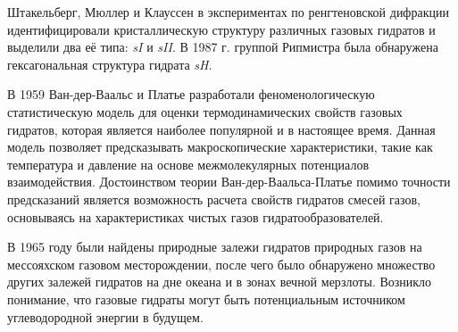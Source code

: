 \par Штакельберг, Мюллер и Клауссен в экспериментах по ренгтеновской дифракции идентифицировали кристаллическую структуру различных газовых гидратов и выделили два её типа: \textit{sI} и \textit{sII}. В 1987 г. группой Рипмистра была обнаружена гексагональная структура гидрата \textit{sH}.

\par В 1959 Ван-дер-Ваальс и Платье разработали  феноменологическую статистическую модель для оценки термодинамических свойств газовых гидратов, которая является наиболее популярной и в настоящее время. Данная модель позволяет предсказывать макроскопические характеристики, такие как температура и давление на основе межмолекулярных потенциалов взаимодействия. Достоинством теории Ван-дер-Ваальса-Платье помимо точности предсказаний является возможность расчета свойств гидратов смесей газов, основываясь на характеристиках чистых газов гидратообразователей.

\par В 1965 году были найдены природные залежи гидратов природных газов на мессояхском газовом месторождении, после чего было обнаружено множество других залежей гидратов на дне океана и в зонах вечной мерзлоты. Возникло понимание, что газовые гидраты могут быть потенциальным источником углеводородной энергии в будущем.

